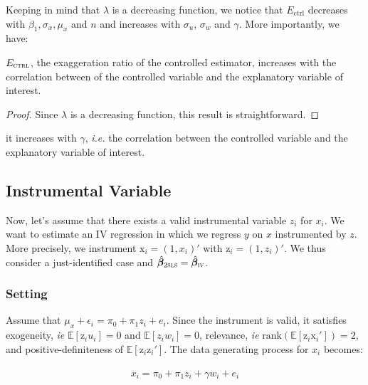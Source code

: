 \documentclass[a4paper, 11pt]{report}
\begin{document}
			Keeping in mind that $\lambda$ is a decreasing function, we notice that $E_\text{ctrl}$ decreases with $\beta_{1}, \sigma_{x}, \mu_{x}$ and $n$ and increases with $\sigma_{u}$, $\sigma_{w}$ and $\gamma$. More importantly, we have:
			~	
			\begin{proposition}
					 $E_{\textsc{ctrl}}$, the exaggeration ratio of the controlled estimator, increases with the correlation between of the controlled variable and the explanatory variable of interest.
				\end{proposition}
				
				\begin{proof}
					Since $\lambda$ is a decreasing function, this result is straightforward.
				\end{proof}
			 it increases with $\gamma$, \textit{i.e.} the correlation between the controlled variable and the explanatory variable of interest. 

				
		
		\subsection{Instrumental Variable}
		
			Now, let's assume that there exists a valid instrumental variable $z_i$ for $x_i$. We want to estimate an IV regression in which we regress $y$ on $x$ instrumented by $z$. More precisely, we instrument $\text{x}_{i} = (1, x_{i})'$ with $\text{z}_{i} = (1, z_{i})'$. We thus consider a just-identified case and $\hat{\bm{\beta}}_{\textsc{2sls}} = \hat{\bm{\beta}}_{\textsc{iv}}$. 
		
			\subsubsection{Setting}
		
				Assume that $\mu_x + \epsilon_{i} = \pi_0 + \pi_1 z_i + e_{i}$. Since the instrument is valid, it satisfies exogeneity, \textit{ie} $\mathbb{E}[\text{z}_{i}u_{i}] = 0$ and  $\mathbb{E}[z_{i}w_{i}] = 0$, relevance, \textit{ie} $\text{rank}(\mathbb{E}[\text{z}_{i}\text{x}_i']) = 2$,  and positive-definiteness of $\mathbb{E}[\text{z}_i \text{z}_i']$. The data generating process for $x_i$ becomes:			
				~
				\begin{equation}\label{maths_dgp_x_iv}
					x_i = \pi_0 + \pi_1 z_i + \gamma w_{i} + e_{i}
				\end{equation}
				
\end{document}
